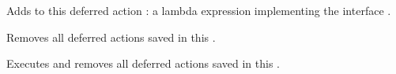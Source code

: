 \item[\tx{void }\textbf{actAdd}\tx{(Deferred act)}]\upsp \newline
   Adds to this \Phrase deferred action : a lambda expression implementing 
   the interface .
   
\item[\tx{void }\textbf{actClear}\tx{()}]\upsp \newline
   Removes all deferred actions saved in this \Phrase.
   
\item[\tx{void }\textbf{actExec}\tx{()}]\upsp \newline
   Executes and removes all deferred actions saved in this \Phrase.

\eul
